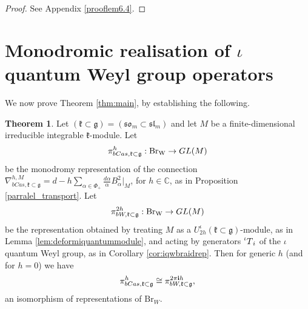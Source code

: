\documentclass[10pt]{amsart}
\numberwithin{equation}{section}
\theoremstyle{definition}
\newtheorem{theorem}{Theorem}[section]
\def\C{{\mathbb C}}
\newcommand{\Br}{\mathrm{Br}}
\newcommand{\iQW}{\prescript{\iota}{}{T}}
\DeclareMathOperator{\BrW}{{\rm Br}_{W}}
\newcommand{\g}{\mathfrak{g}}
\newcommand{\kompact}{\mathfrak{k}}
\begin{document}
\begin{proof}
See Appendix \ref{prooflem6.4}.
\end{proof}

%
\section{Monodromic realisation of $\iota$quantum Weyl group operators}\label{sec7}
%

We now prove Theorem \ref{thm:main}, by establishing the following.

\begin{theorem}\label{monodromy}
    Let $(\mathfrak{k}\subset \mathfrak{g}) = (\mathfrak{so}_m\subset \mathfrak{sl}_m)$ and let $M$ be a finite-dimensional irreducible integrable $\mathfrak{k}$-module. Let 
    \[
    \pi_{bCas,\kompact\subset \g}^h:\BrW\rightarrow GL(M)
    \]
    be the monodromy representation of the connection $\nabla_{bCas, \kompact\subset \g}^{h,M}=d- h\sum_{\alpha\in \Phi_+}\frac{d\alpha}{\alpha}B_{\alpha}^2|_M$, for $h\in\C$, as in Proposition \ref{parralel_transport}. Let 
    \[
    \pi_{bW, \kompact\subset \g}^{2h}:\BrW\rightarrow GL(M)
    \]
    be the representation obtained by treating $M$ as a $U^{\iota}_{2h}(\mathfrak{k}\subset \mathfrak{g})$-module, as in Lemma \ref{lem:deformiquantummodule}, and acting by generators $\iQW_i$ of the $\iota$quantum Weyl group, as in Corollary \ref{cor:iqwbraidrep}. Then for generic $h$ (and for $h=0$) we have
    \[
    \pi^h_{bCas,\kompact\subset \g} \cong \pi_{bW, \kompact \subset \g}^{2\pi {\bf i}h},
    \]
    an isomorphism of representations of $\Br_W$.
\end{theorem}
\end{document}
